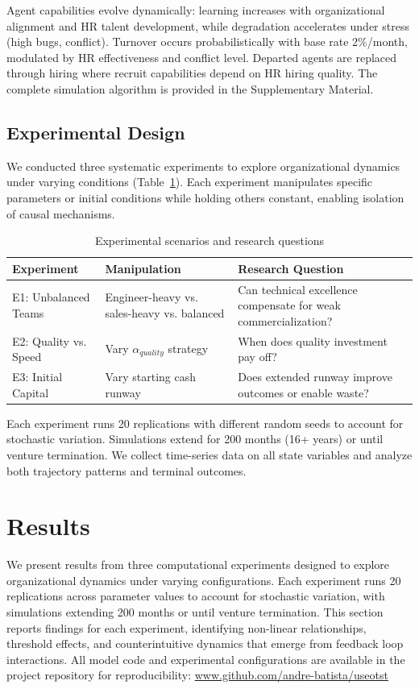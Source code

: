 \documentclass[alpha-refs]{wiley-article}
\begin{document}
Agent capabilities evolve dynamically: learning increases with organizational alignment and HR talent development, while degradation accelerates under stress (high bugs, conflict). Turnover occurs probabilistically with base rate 2\%/month, modulated by HR effectiveness and conflict level. Departed agents are replaced through hiring where recruit capabilities depend on HR hiring quality. The complete simulation algorithm is provided in the Supplementary Material.

\subsection{Experimental Design}

We conducted three systematic experiments to explore organizational dynamics under varying conditions (Table~\ref{tab:experiments}). Each experiment manipulates specific parameters or initial conditions while holding others constant, enabling isolation of causal mechanisms.

\begin{table}[!htbp]
\centering
\caption{Experimental scenarios and research questions}
\label{tab:experiments}
\begin{tabular}{|l|p{4cm}|p{4cm}|}
\hline
\textbf{Experiment} & \textbf{Manipulation} & \textbf{Research Question} \\
\hline
E1: Unbalanced Teams & Engineer-heavy vs. sales-heavy vs. balanced & Can technical excellence compensate for weak commercialization? \\
\hline
E2: Quality vs. Speed & Vary $\alpha_{quality}$ strategy & When does quality investment pay off? \\
\hline
E3: Initial Capital & Vary starting cash runway & Does extended runway improve outcomes or enable waste? \\
\hline
\end{tabular}
\end{table}

Each experiment runs 20 replications with different random seeds to account for stochastic variation. Simulations extend for 200 months (16+ years) or until venture termination. We collect time-series data on all state variables and analyze both trajectory patterns and terminal outcomes.

\section{Results}

We present results from three computational experiments designed to explore organizational dynamics under varying configurations. Each experiment runs 20 replications across parameter values to account for stochastic variation, with simulations extending 200 months or until venture termination. This section reports findings for each experiment, identifying non-linear relationships, threshold effects, and counterintuitive dynamics that emerge from feedback loop interactions. All model code and experimental configurations are available in the project repository for reproducibility: \url{www.github.com/andre-batista/useotst}
\end{document}
